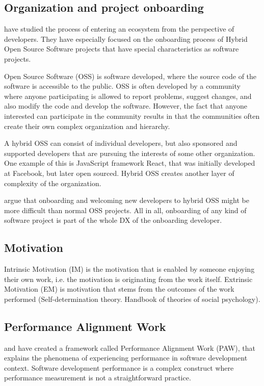 \documentclass[english, 12pt, a4paper, sci, utf8, a-1b, online]{aaltothesis}
\begin{document}
\subsection{Organization and project onboarding}

\cite{entering-an-ecosystem} have studied the process of entering an ecosystem from the perspective of developers. They have especially focused on the onboarding process of Hybrid Open Source Software projects that have special characteristics as software projects.

Open Source Software (OSS) is software developed, where the source code of the software is accessible to the public. OSS is often developed by a community where anyone participating is allowed to report problems, suggest changes, and also modify the code and develop the software. However, the fact that anyone interested can participate in the community results in that the communities often create their own complex organization and hierarchy.

A hybrid OSS can consist of individual developers, but also sponsored and supported developers that are pursuing the interests of some other organization. One example of this is JavaScript framework React, that was initially developed at Facebook, but later open sourced. Hybrid OSS creates another layer of complexity of the organization.

\cite{entering-an-ecosystem} argue that onboarding and welcoming new developers to hybrid OSS might be more difficult than normal OSS projects. All in all, onboarding of any kind of software project is part of the whole DX of the onboarding developer.

\subsection{Motivation}

Intrinsic Motivation (IM) is the motivation that is enabled by someone enjoying their own work, i.e. the motivation is originating from the work itself. Extrinsic Motivation (EM) is motivation that stems from the outcomes of the work performed \citep{flow-intrinsic-dx} (Self-determination theory. Handbook of theories of social psychology).

\subsection{Performance Alignment Work}

\cite{how-developers-experience-team-performance} and \cite{paw} have created a framework called Performance Alignment Work (PAW), that explains the phenomena of experiencing performance in software development context. Software development performance is a complex construct where performance measurement is not a straightforward practice.
\end{document}
